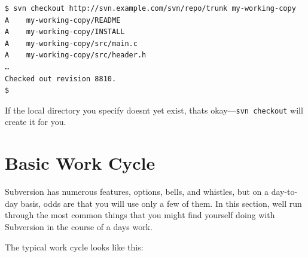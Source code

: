 \begin{verbatim}
$ svn checkout http://svn.example.com/svn/repo/trunk my-working-copy
A    my-working-copy/README
A    my-working-copy/INSTALL
A    my-working-copy/src/main.c
A    my-working-copy/src/header.h
…
Checked out revision 8810.
$
\end{verbatim}

If the local directory you specify doesn\textquotesingle t yet exist,
that\textquotesingle s okay---\texttt{svn\ checkout} will create it for
you.

\section{Basic Work Cycle}\label{svn.tour.cycle}

Subversion has numerous features, options, bells, and whistles, but on a
day-to-day basis, odds are that you will use only a few of them. In this
section, we\textquotesingle ll run through the most common things that
you might find yourself doing with Subversion in the course of a
day\textquotesingle s work.

The typical work cycle looks like this:

